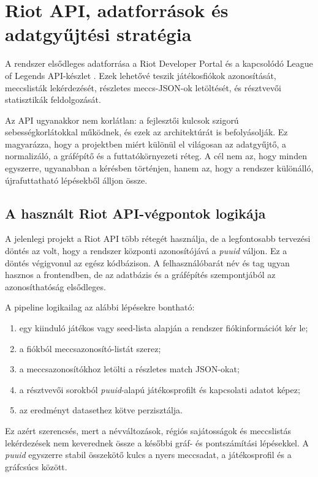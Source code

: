 \chapter{Riot API, adatforrások és adatgyűjtési stratégia}

A rendszer elsődleges adatforrása a Riot Developer Portal és a kapcsolódó League of Legends API-készlet \cite{riotportal,riotapi}. Ezek lehetővé teszik játékosfiókok azonosítását, meccslisták lekérdezését, részletes meccs-JSON-ok letöltését, és résztvevői statisztikák feldolgozását.

Az API ugyanakkor nem korlátlan: a fejlesztői kulcsok szigorú sebességkorlátokkal működnek, és ezek az architektúrát is befolyásolják. Ez magyarázza, hogy a projektben miért különül el világosan az adatgyűjtő, a normalizáló, a gráfépítő és a futtatókörnyezeti réteg. A cél nem az, hogy minden egyszerre, ugyanabban a kérésben történjen, hanem az, hogy a rendszer különálló, újrafuttatható lépésekből álljon össze.

\section{A használt Riot API-végpontok logikája}

A jelenlegi projekt a Riot API több rétegét használja, de a legfontosabb tervezési döntés az volt, hogy a rendszer központi azonosítójává a \textit{puuid} váljon. Ez a döntés végigvonul az egész kódbázison. A felhasználóbarát név és tag ugyan hasznos a frontendben, de az adatbázis és a gráfépítés szempontjából az azonosíthatóság elsődleges.

A pipeline logikailag az alábbi lépésekre bontható:

\begin{enumerate}
    \item egy kiinduló játékos vagy seed-lista alapján a rendszer fiókinformációt kér le;
    \item a fiókból meccsazonosító-listát szerez;
    \item a meccsazonosítókhoz letölti a részletes match JSON-okat;
    \item a résztvevői sorokból \textit{puuid}-alapú játékosprofilt és kapcsolati adatot képez;
    \item az eredményt datasethez kötve perzisztálja.
\end{enumerate}

Ez azért szerencsés, mert a névváltozások, régiós sajátosságok és meccslistás lekérdezések nem keverednek össze a későbbi gráf- és pontszámítási lépésekkel. A \textit{puuid} egyszerre stabil összekötő kulcs a nyers meccsadat, a játékosprofil és a gráfcsúcs között.


